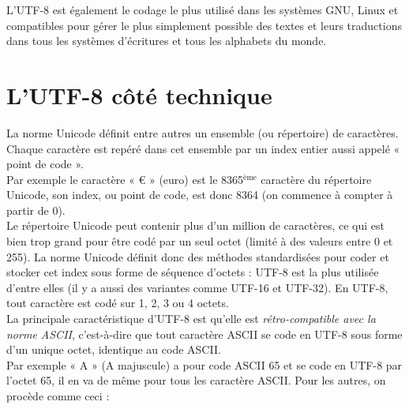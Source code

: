L'UTF-8 est également le codage le plus utilisé dans les systèmes GNU, Linux et compatibles pour gérer le plus simplement
possible des textes et leurs traductions dans tous les systèmes d'écritures et tous les alphabets du monde.\\

\section{L'UTF-8 côté technique}

La norme Unicode définit entre autres un ensemble (ou répertoire) de caractères. Chaque caractère est repéré dans cet ensemble par un index
entier aussi appelé « point de code ».\\
Par exemple le caractère « € » (euro) est le 8365$^{\text{ème}}$ caractère du répertoire Unicode, son index, ou point de code, est donc
8364
(on commence à compter à partir de 0).\\
Le répertoire Unicode peut contenir plus d'un million de caractères, ce qui est bien trop grand pour être codé par un seul octet (limité à des
valeurs entre 0 et 255).
La norme Unicode définit donc des méthodes standardisées pour coder et stocker cet index sous forme de séquence d'octets :
UTF-8 est la plus utilisée d'entre elles (il y a aussi des variantes comme UTF-16 et UTF-32).
En UTF-8, tout caractère est codé sur 1, 2, 3 ou 4 octets.\\
La principale caractéristique d'UTF-8 est qu'elle est \textit{rétro-compatible avec la norme ASCII}, c'est-à-dire que tout caractère ASCII se
code
en UTF-8 sous forme d'un unique octet, identique au code ASCII.\\
Par exemple « A » (A majuscule) a pour code ASCII 65 et se code en UTF-8 par l'octet 65, il en va de même pour tous les caractère ASCII.
Pour les autres, on procède comme ceci :
